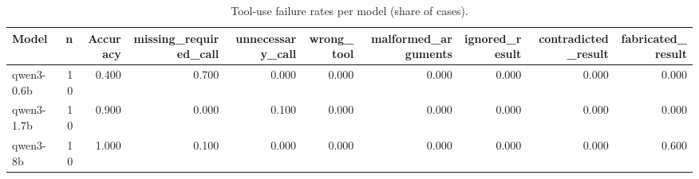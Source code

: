 \begin{table}[t]
\centering
\small
\caption{Tool-use failure rates per model (share of cases).}
\label{tab:tool_use}
\begin{tabular}{lrrrrrrrrr}
\toprule
Model & n & Accuracy & missing\_required\_call & unnecessary\_call & wrong\_tool & malformed\_arguments & ignored\_result & contradicted\_result & fabricated\_result \\
\midrule
qwen3-0.6b & 10 & 0.400 & 0.700 & 0.000 & 0.000 & 0.000 & 0.000 & 0.000 & 0.000 \\
qwen3-1.7b & 10 & 0.900 & 0.000 & 0.100 & 0.000 & 0.000 & 0.000 & 0.000 & 0.000 \\
qwen3-8b & 10 & 1.000 & 0.100 & 0.000 & 0.000 & 0.000 & 0.000 & 0.000 & 0.600 \\
\bottomrule
\end{tabular}
\end{table}
